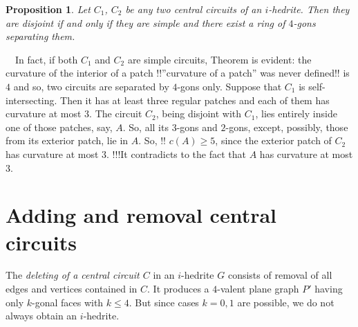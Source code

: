 \documentclass[12pt]{article}
\newtheorem{proposition}{Proposition}
\newcommand{\proof}{\noindent{\bf Proof.}\ \ }
\begin{document}
\begin{proposition}\label{intersec}
Let $C_1$, $C_2$ be any two central circuits of an $i$-hedrite. Then 
they are disjoint if and only if they are simple and there exist a 
ring of $4$-gons separating them.

\end{proposition}
\proof In fact, if both $C_1$ and $C_2$ are simple circuits, Theorem 
is evident: the curvature of the interior of a patch
!!''curvature of a patch'' was never defined!!
is $4$ and so, two
circuits are separated by $4$-gons only. Suppose that $C_1$ is 
self-intersecting. Then it has at least three regular patches and each 
of them has curvature at most $3$.
The circuit $C_2$, being disjoint with $C_1$, lies entirely inside one 
of those patches, say, $A$. So, all its $3$-gons and $2$-gons, except, 
possibly, those from its exterior patch, lie in $A$. So, !! $c(A)\geq 5$,
since the exterior patch of $C_2$ has curvature at most $3$.
!!!It contradicts to the fact that $A$ has curvature at most $3$. 








\section{Adding and removal central circuits}


%
%
%
%
%


The {\em deleting of a central circuit $C$} in an $i$-hedrite $G$ consists 
of removal of all edges and vertices contained in $C$. It produces a 
$4$-valent plane graph $P'$ having only $k$-gonal faces 
with $k \leq 4$. But since cases $k=0,1$ are possible, we do not
always obtain an $i$-hedrite.
\end{document}
